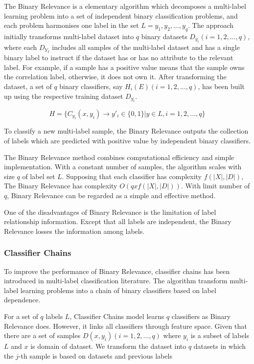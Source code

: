 The Binary Relevance is a elementary algorithm which decomposes a multi-label learning problem into a set of independent binary classification problems, and each problem harmonises one label in the set $L = {y_{1}, y_{2},...,y_{q}}$. The approach initially transforms multi-label dataset into $q$ binary datasets $D_{y_{i}} (i = 1,2,...,q)$, where each $D_{Y_{I}}$ includes all samples of the multi-label dataset and has a single binary label to instruct if the dataset has or has no attribute to the relevant label. For example, if a sample has a positive value means that the sample owns the correlation label, otherwise, it does not own it. After transforming the dataset, a set of $q$ binary classifiers, say $H_{i}(E) (i = 1,2,...,q)$, has been built up using the respective training dataset $D_{y_{i}}$. 

\begin{equation}\label{eq:BinaryRelevance}
H = \{C_{y_{i}}(x, y_{i}) \to y'_{i} \in \{0,1\}| y \in L, i = 1,2,...,q\}
\end{equation}

To classify a new multi-label sample, the Binary Relevance outputs the collection of labels which are predicted with positive value by independent binary classifiers.

The Binary Relevance method combines computational efficiency and simple implementation. With a constant number of samples, the algorithm scales with size $q$ of label set $L$. Supposing that each classifier has complexity $f(|X|,|D|)$, The Binary Relevance has complexity $O(qxf(|X|,|D|))$. With limit number of $q$, Binary Relevance can be regarded as a simple and effective method.

One of the disadvantages of Binary Relevance is the limitation of label relationship information. Except that all labels are independent, the Binary Relevance losses the information among labels.

\subsubsection{Classifier Chains}

To improve the performance of Binary Relevance, classifier chains has been introduced in multi-label classification literature\citep{read2011classifier}. The algorithm transform multi-label learning problems into a chain of binary classifiers based on label dependence.

For a set of $q$ labels $L$, Classifier Chains model learns $q$ classifiers as Binary Relevance does. However, it links all classifiers through feature space. Given that there are a set of samples $D(x,y_{i}) (i = 1,2,...,q)$ where $y_{i}$ is a subset of labels $L$ and $x$ is domain of dataset. We transform the dataset into $q$ datasets in which the $j$-th sample is based on datasets and previous labels

